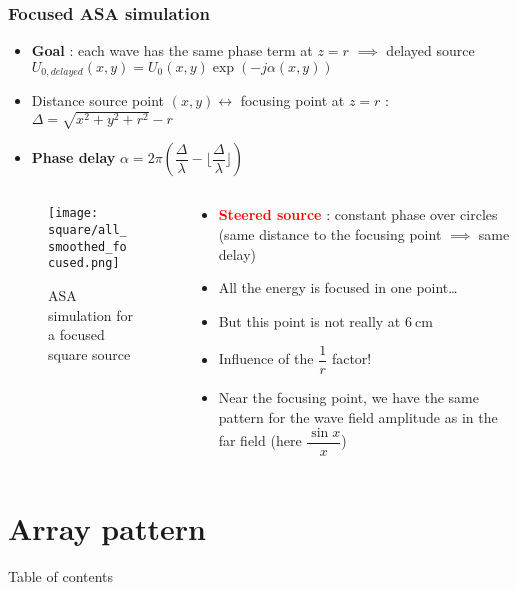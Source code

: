 \documentclass[UKenglish,8pt,aspectratio=1610]{beamer}
\begin{document}
	\begin{frame}
		\frametitle{Focused ASA simulation}
		\begin{itemize}
			\item \textbf{Goal} : each wave has the same phase term at $z=r$ $\implies$ delayed source $U_{0,delayed}(x,y)=U_0(x,y)\exp(-j\alpha(x,y))$
			\item Distance source point $(x,y)\leftrightarrow$ focusing point at $z=r$ : $\Delta=\sqrt{x^2+y^2+r^2}-r$
			\item \textbf{Phase delay} $\alpha=2\pi\left(\dfrac{\Delta}{\lambda}-\lfloor\dfrac{\Delta}{\lambda}\rfloor\right)$
		\end{itemize}

	\begin{columns}
	\begin{column}{0.6\textwidth}
		
		\vspace{-10pt}
		\begin{figure}[h!]
		\texttt{[image: square/all\_smoothed\_focused.png]}
			\centering
			\caption{ASA simulation for a focused square source}
		\end{figure}
	\end{column}
	\begin{column}{0.4\textwidth}
	\begin{itemize}
		\item \textcolor{red}{\textbf{Steered source}} : constant phase over circles (same distance to the focusing point $\implies$ same delay)
		\item All the energy is focused in one point\dots
		\item But this point is not really at $6~\si{\centi\meter}$
		\item Influence of the $\dfrac{1}{r}$ factor!
		\item Near the focusing point, we have the same pattern for the wave field amplitude as in the far field (here $\dfrac{\sin x}{x}$)
	\end{itemize}
		
	\end{column}
\end{columns}
	
	
	
	
	
	\end{frame}
	\section{Array pattern}
		\begin{frame}{Table of contents}
		\tableofcontents
	\end{frame}
\end{document}
